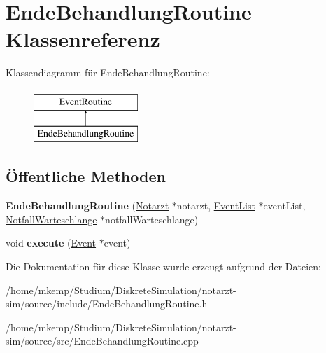 \hypertarget{classEndeBehandlungRoutine}{}\section{Ende\+Behandlung\+Routine Klassenreferenz}
\label{classEndeBehandlungRoutine}
Klassendiagramm für Ende\+Behandlung\+Routine\+:\begin{figure}[H]
\begin{center}
\leavevmode
\includegraphics[height=2.000000cm]{classEndeBehandlungRoutine}
\end{center}
\end{figure}
\subsection*{Öffentliche Methoden}
\begin{DoxyCompactItemize}
\item 
{\bfseries Ende\+Behandlung\+Routine} (\hyperlink{classNotarzt}{Notarzt} $\ast$notarzt, \hyperlink{classEventList}{Event\+List} $\ast$event\+List, \hyperlink{classNotfallWarteschlange}{Notfall\+Warteschlange} $\ast$notfall\+Warteschlange)\hypertarget{classEndeBehandlungRoutine_a62832ad29d885996aef9ca7f3a8ca169}{}\label{classEndeBehandlungRoutine_a62832ad29d885996aef9ca7f3a8ca169}

\item 
void {\bfseries execute} (\hyperlink{classEvent}{Event} $\ast$event)\hypertarget{classEndeBehandlungRoutine_a462bdb38325bd4b5d550d4d9145e1558}{}\label{classEndeBehandlungRoutine_a462bdb38325bd4b5d550d4d9145e1558}

\end{DoxyCompactItemize}


Die Dokumentation für diese Klasse wurde erzeugt aufgrund der Dateien\+:\begin{DoxyCompactItemize}
\item 
/home/mkemp/\+Studium/\+Diskrete\+Simulation/notarzt-\/sim/source/include/Ende\+Behandlung\+Routine.\+h\item 
/home/mkemp/\+Studium/\+Diskrete\+Simulation/notarzt-\/sim/source/src/Ende\+Behandlung\+Routine.\+cpp\end{DoxyCompactItemize}

